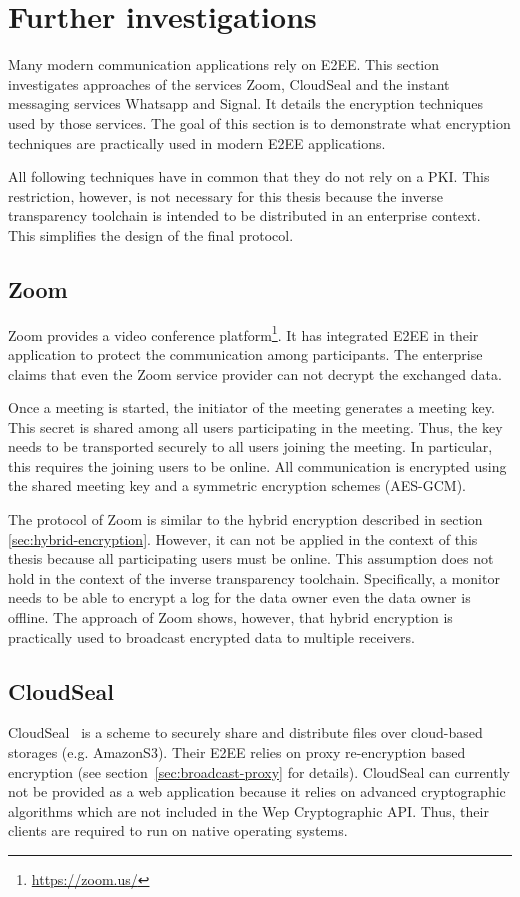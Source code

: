 \documentclass[../main.tex]{subfiles}
\begin{document}
\section{Further investigations}

Many modern communication applications rely on E2EE. 
This section investigates approaches of the services Zoom, CloudSeal and the instant messaging services Whatsapp and Signal.
It details the encryption techniques used by those services.
The goal of this section is to demonstrate what encryption techniques are practically used in modern E2EE applications.

All following techniques have in common that they do not rely on a PKI.
This restriction, however, is not necessary for this thesis because the inverse transparency toolchain is intended to be distributed in an enterprise context.
This simplifies the design of the final protocol.

\subsection{Zoom}
Zoom provides a video conference platform\footnote{\url{https://zoom.us/}}. 
It has integrated E2EE in their application to protect the communication among participants.
The enterprise claims that even the Zoom service provider can not decrypt the exchanged data.~\cite{Blum2020}

Once a meeting is started, the initiator of the meeting generates a meeting key.
This secret is shared among all users participating in the meeting.
Thus, the key needs to be transported securely to all users joining the meeting.
In particular, this requires the joining users to be online.
All communication is encrypted using the shared meeting key and a symmetric encryption schemes (AES-GCM).
~\cite{Isobe2021}

The protocol of Zoom is similar to the hybrid encryption described in section \ref{sec:hybrid-encryption}.
However, it can not be applied in the context of this thesis because all participating users must be online.
This assumption does not hold in the context of the inverse transparency toolchain.
Specifically, a monitor needs to be able to encrypt a log for the data owner even the data owner is offline.
The approach of Zoom shows, however, that hybrid encryption is practically used to broadcast encrypted data to multiple receivers.

\subsection{CloudSeal}
CloudSeal~\cite{Xiong2012} is a scheme to securely share and distribute files over cloud-based storages (e.g. AmazonS3).
Their E2EE relies on proxy re-encryption based encryption (see section~\ref{sec:broadcast-proxy} for details).
CloudSeal can currently not be provided as a web application because it relies on advanced cryptographic algorithms which are not included in the Wep Cryptographic API.
Thus, their clients are required to run on native operating systems.~\cite{Xiong2012}
\end{document}
